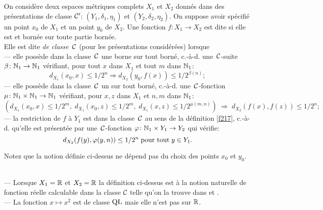 \begin{fdefinition} \label{f231}
On considère deux espaces métriques complets  $X_1$  et  $X_2$  donnés 
dans  des présentations de classe  ${{\cal C}}'$:   $(Y_1,\delta_1,\eta_1)$  et  
$(Y_2,\delta_2,\eta_2).$  On suppose avoir spécifié un point  $x_0$  de  
$X_1$  et un point  $y_0$  de  $X_2$. Une fonction  $f\colon  X_1  \rightarrow   X_2$   
est dite {\em \loca \unicoz}   si elle est \unico et bornée sur toute partie 
bornée.\\
Elle est dite {\em \loca \uni de classe~${{\cal C}}$}   (pour les présentations 
considérées) lorsque\\
--- elle possède dans la classe~${{\cal C}}$   une borne sur tout borné, c.-à-d. 
une~${{\cal C}}$-suite  $\beta \colon  \mathbb {N}_1 \rightarrow \mathbb {N}_1$ vérifiant, pour tout  $x$  dans  
$X_1$  et tout  $m$   dans  $\mathbb {N}_1$:    
\[
d_{X_1}(x_0,x) \leq 1/2^n \Rightarrow d_{X_2}(y_0,f(x)) \leq 1/2^{\beta(n)};
\]
--- elle possède dans la classe~${{\cal C}}$   un \mcu sur tout borné, c.-à-d. 
une~${{\cal C}}$-fonction  $\mu \colon  \mathbb {N}_1 \times \mathbb {N}_1 \rightarrow \mathbb {N}_1$   vérifiant,   pour   
$x, z$  dans  $X_1$  et   $n, m$  dans  $\mathbb {N}_1$:    
\[
\left( d_{X_1}(x_0,x) \leq 1/2^m, \;d_{X_1}(x_0,z) \leq 1/2^m, \; d_{X_1}(x,z) \leq 1/2^{\mu(m,n)}\right) \; \Rightarrow\; d_{X_2}(f(x),f(z)) \leq 1/2^n;
\] 
--- la restriction de $f$ à $Y_1$ est dans la classe~${{\cal C}}$ au sens de 
la définition \ref{f217}, c.-à-d. qu'elle est présentée par une~${{\cal C}}$-fonction    
$\varphi\colon \mathbb {N}_1 \times Y_1 \rightarrow Y_2 $     qui vérifie:
\[
d_{X_2}(f(y),\varphi(y,n)) \leq 1/2^n \;\hbox{pour tout} \; y \in Y_1.
\]
\end{fdefinition}
 
Notez que la notion définie ci-dessus ne dépend pas du choix des points
$x_0$ et $y_0$.

\begin{fexamples}\label{f232}~\\
--- Lorsque  $X_1 = \mathbb {R}$  et  $X_2 = \mathbb {R}$  la définition ci-dessus est 
\equiva à la notion naturelle de fonction réelle calculable dans la classe  
${{\cal C}}$   telle qu'on la trouve dans \cite{fHo90} et \cite{fKo91}.\\
--- La fonction  $x \mapsto x^2$  est \loca \unico de classe ${\rm QL}$ mais elle 
n'est pas \unico sur $\mathbb {R}$.
\end{fexamples}

